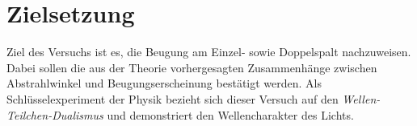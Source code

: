 \section{Zielsetzung}
\label{sec:Zielsetzung}

Ziel des Versuchs ist es, die Beugung am Einzel- sowie Doppelspalt nachzuweisen.
Dabei sollen die aus der Theorie vorhergesagten Zusammenhänge zwischen Abstrahlwinkel und Beugungserscheinung bestätigt werden.
Als Schlüsselexperiment der Physik bezieht sich dieser Versuch auf den \textit{Wellen-Teilchen-Dualismus} und demonstriert den Wellencharakter des Lichts.